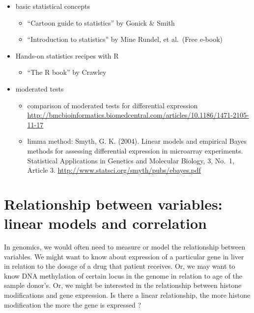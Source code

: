 \documentclass[12pt,]{krantz}
\providecommand{\tightlist}{%
  \setlength{\itemsep}{0pt}\setlength{\parskip}{0pt}}
\begin{document}
\begin{itemize}
\tightlist
\item
  basic statistical concepts

  \begin{itemize}
  \tightlist
  \item
    ``Cartoon guide to statistics'' by Gonick \& Smith
  \item
    ``Introduction to statistics'' by Mine Rundel, et al.~(Free e-book)
  \end{itemize}
\item
  Hands-on statistics recipes with R

  \begin{itemize}
  \tightlist
  \item
    ``The R book'' by Crawley
  \end{itemize}
\item
  moderated tests

  \begin{itemize}
  \tightlist
  \item
    comparison of moderated tests for differential expression \url{http://bmcbioinformatics.biomedcentral.com/articles/10.1186/1471-2105-11-17}
  \item
    limma method: Smyth, G. K. (2004). Linear models and empirical Bayes methods for assessing differential expression in microarray experiments. Statistical Applications in Genetics and Molecular Biology, 3, No.~1, Article 3. \url{http://www.statsci.org/smyth/pubs/ebayes.pdf}
  \end{itemize}
\end{itemize}

\hypertarget{relationship-between-variables-linear-models-and-correlation}{%
\section{Relationship between variables: linear models and correlation}\label{relationship-between-variables-linear-models-and-correlation}}

In genomics, we would often need to measure or model the relationship between
variables. We might want to know about expression of a particular gene in liver
in relation to the dosage of a drug that patient receives. Or, we may want to know
DNA methylation of certain locus in the genome in relation to age of the sample
donor's. Or, we might be interested in the relationship between histone
modifications and gene expression. Is there a linear relationship, the more
histone modification the more the gene is expressed ?
\end{document}
